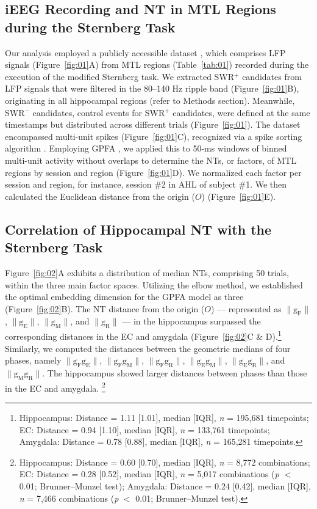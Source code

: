 \documentclass[preprint,review,12pt]{elsarticle}%
\begin{document}
\subsection{iEEG Recording and NT in MTL Regions during the Sternberg Task}
Our analysis employed a publicly accessible dataset \cite{boran_dataset_2020}, which comprises LFP signals (Figure~\ref{fig:01}A) from MTL regions (Table~\ref{tab:01}) recorded during the execution of the modified Sternberg task. We extracted SWR$^+$ candidates from LFP signals that were filtered in the 80--140 Hz ripple band (Figure~\ref{fig:01}B), originating in all hippocampal regions (refer to Methods section). Meanwhile, SWR$^-$ candidates, control events for SWR$^+$ candidates, were defined at the same timestamps but distributed across different trials (Figure~\ref{fig:01}). The dataset encompassed multi-unit spikes (Figure~\ref{fig:01}C), recognized via a spike sorting algorithm \cite{niediek_reliable_2016}. Employing GPFA \cite{yu_gaussian-process_2009}, we applied this to 50-ms windows of binned multi-unit activity without overlaps to determine the NTs, or factors, of MTL regions by session and region (Figure~\ref{fig:01}D). We normalized each factor per session and region, for instance, session \#2 in AHL of subject \#1. We then calculated the Euclidean distance from the origin ($O$) (Figure~\ref{fig:01}E).

\subsection{Correlation of Hippocampal NT with the Sternberg Task}
Figure~\ref{fig:02}A exhibits a distribution of median NTs, comprising 50 trials, within the three main factor spaces. Utilizing the elbow method, we established the optimal embedding dimension for the GPFA model as three (Figure~\ref{fig:02}B). The NT distance from the origin ($O$) --- represented as $\mathrm{\lVert g_{F} \rVert}$, $\mathrm{\lVert g_{E} \rVert}$, $\mathrm{\lVert g_{M} \rVert}$, and $\mathrm{\lVert g_{R} \rVert}$ --- in the hippocampus surpassed the corresponding distances in the EC and amygdala (Figure~\ref{fig:02}C \& D).\footnote{Hippocampus: Distance = 1.11 [1.01], median [IQR], \textit{n} = 195,681 timepoints; EC: Distance = 0.94 [1.10], median [IQR], \textit{n} = 133,761 timepoints; Amygdala: Distance = 0.78 [0.88], median [IQR], \textit{n} = 165,281 timepoints.}
\\
\indent
Similarly, we computed the distances between the geometric medians of four phases, namely $\mathrm{\lVert g_{F}g_{E} \rVert}$, $\mathrm{\lVert g_{F}g_{M} \rVert}$, $\mathrm{\lVert g_{F}g_{R} \rVert}$, $\mathrm{\lVert g_{E}g_{M} \rVert}$, $\mathrm{\lVert g_{E}g_{R} \rVert}$, and $\mathrm{\lVert g_{M}g_{R} \rVert}$. The hippocampus showed larger distances between phases than those in the EC and amygdala. \footnote{Hippocampus: Distance = 0.60 [0.70], median [IQR], \textit{n} = 8,772 combinations; EC: Distance = 0.28 [0.52], median [IQR], \textit{n} = 5,017 combinations (\textit{p} $<$ 0.01; Brunner--Munzel test); Amygdala: Distance = 0.24 [0.42], median [IQR], \textit{n} = 7,466 combinations (\textit{p} $<$ 0.01; Brunner--Munzel test).}
\end{document}
